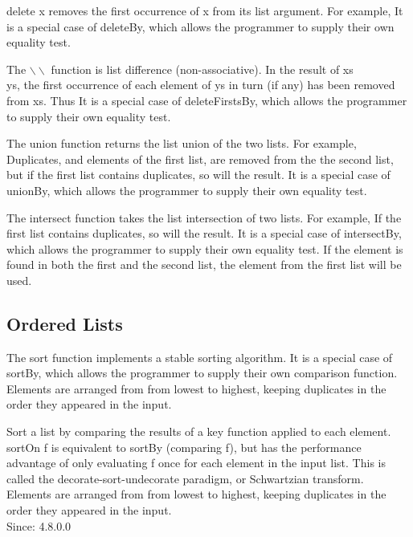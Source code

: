 delete x removes the first occurrence of x from its list argument. For example,
It is a special case of deleteBy, which allows the programmer to supply their own equality test.

The $\backslash \backslash$ function is list difference (non-associative). In the result of xs \\ ys, the first occurrence of each element of ys in turn (if any) has been removed from xs. Thus
It is a special case of deleteFirstsBy, which allows the programmer to supply their own equality test.

The union function returns the list union of the two lists. For example,
Duplicates, and elements of the first list, are removed from the the second list, but if the first list contains duplicates, so will the result. It is a special case of unionBy, which allows the programmer to supply their own equality test.

The intersect function takes the list intersection of two lists. For example,
If the first list contains duplicates, so will the result.
It is a special case of intersectBy, which allows the programmer to supply their own equality test. If the element is found in both the first and the second list, the element from the first list will be used.

\subsection{Ordered Lists}
The sort function implements a stable sorting algorithm. It is a special case of sortBy, which allows the programmer to supply their own comparison function.\\
Elements are arranged from from lowest to highest, keeping duplicates in the order they appeared in the input.

Sort a list by comparing the results of a key function applied to each element. sortOn f is equivalent to sortBy (comparing f), but has the performance advantage of only evaluating f once for each element in the input list. This is called the decorate-sort-undecorate paradigm, or Schwartzian transform.\\
Elements are arranged from from lowest to highest, keeping duplicates in the order they appeared in the input.\\
Since: 4.8.0.0

